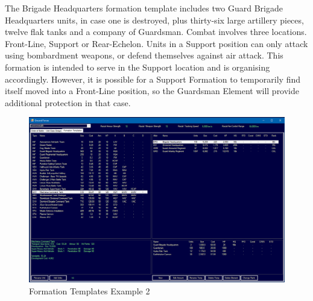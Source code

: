 \documentclass[../Aurora C# unofficial manual.tex]{subfiles}
\begin{document}
	The Brigade Headquarters formation template includes two Guard Brigade Headquarters units, in case one is destroyed, plus thirty-six large artillery pieces, twelve flak tanks and a company of Guardsman. Combat involves three locations. Front-Line, Support or Rear-Echelon. Units in a Support position can only attack using bombardment weapons, or defend themselves against air attack. This formation is intended to serve in the Support location and is organising accordingly. However, it is possible for a Support Formation to temporarily find itself moved into a Front-Line position, so the Guardsman Element will provide additional protection in that case.
	\begin{figure}[H]
		\centering
		\includegraphics[width=0.95\linewidth]{images/FormationTemplates2}
		\caption[Formation Templates]{Formation Templates Example 2}
		\label{fig:formationtemplates2}
	\end{figure}
\end{document}

